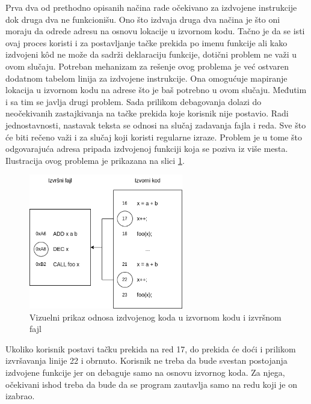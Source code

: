 \documentclass[12pt,oneside]{memoir}
\begin{document}
Prva dva od prethodno opisanih načina rade očekivano za izdvojene instrukcije dok druga dva ne funkcionišu.
Ono što izdvaja druga dva načina je što oni moraju da odrede adresu na osnovu lokacije u izvornom kodu.
Tačno je da se isti ovaj proces koristi i za postavljanje tačke prekida po imenu funkcije ali kako izdvojeni k\^od ne može da sadrži deklaraciju funkcije, dotični problem ne važi u ovom slučaju.
Potreban mehanizam za rešenje ovog problema je već ostvaren dodatnom tabelom linija za izdvojene instrukcije.
Ona omogućuje mapiranje lokacija u izvornom kodu na adrese što je baš potrebno u ovom slučaju.
Međutim i sa tim se javlja drugi problem.
Sada prilikom debagovanja dolazi do neočekivanih zastajkivanja na tačke prekida koje korisnik nije postavio.
Radi jednostavnosti, nastavak teksta se odnosi na slučaj zadavanja fajla i reda.
Sve što će biti rečeno važi i za slučaj koji koristi regularne izraze.
Problem je u tome što odgovarajuća adresa pripada izdvojenoj funkciji koja se poziva iz više mesta.
Ilustracija ovog problema je prikazana na slici \ref{fig:outlined_breakpoint}.
\begin{figure}[!ht]
  \centering
  \includegraphics[width=0.6\textwidth]{assets/outlining_breakpoint.png}
  \caption{Vizuelni prikaz odnosa izdvojenog koda u izvornom kodu i izvršnom fajl}
  \label{fig:outlined_breakpoint}
\end{figure}
Ukoliko korisnik postavi tačku prekida na red 17, do prekida će doći i prilikom izvršavanja linije 22 i obrnuto.
Korisnik ne treba da bude svestan postojanja izdvojene funkcije jer on debaguje samo na osnovu izvornog koda.
Za njega, očekivani ishod treba da bude da se program zautavlja samo na redu koji je on izabrao.
\end{document}
